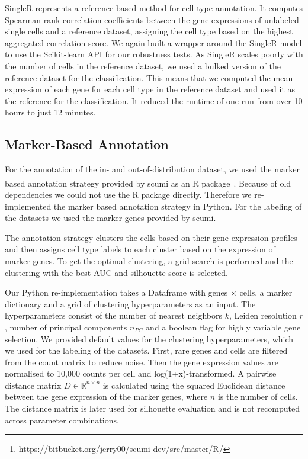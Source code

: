 \documentclass[11pt]{article}
\begin{document}
SingleR \cite{aran_reference-based_2019} represents a reference-based method for cell type annotation. It computes Spearman rank correlation coefficients between the gene expressions of unlabeled single cells and a reference dataset, assigning the cell type based on the highest aggregated correlation score.
We again built a wrapper around the SingleR model to use the Scikit-learn API for our robustness tests. 
As SingleR scales poorly with the number of cells in the reference dataset, we used a bulked version of the reference dataset for the classification. This means that we computed the mean expression of each gene for each cell type in the reference dataset and used it as the reference for the classification. It reduced the runtime of one run from over 10 hours to just 12 minutes.

\subsection{Marker-Based Annotation}\label{sec:methods:marker-based-annotation}

For the annotation of the in- and out-of-distribution dataset, we used the marker based annotation strategy provided by scumi \cite{ding_systematic_2020} as an R package\footnote{https://bitbucket.org/jerry00/scumi-dev/src/master/R/}. Because of old dependencies we could not use the R package directly. Therefore we re-implemented the marker based annotation strategy in Python. For the labeling of the datasets we used the marker genes provided by scumi.

The annotation strategy clusters the cells based on their gene expression profiles and then assigns cell type labels to each cluster based on the expression of marker genes. To get the optimal clustering, a grid search is performed and the clustering with the best AUC and silhouette score is selected.

Our Python re-implementation takes a Dataframe with genes $\times$ cells, a marker dictionary and a grid of clustering hyperparameters as an input. The hyperparameters consist of the number of nearest neighbors $k$, Leiden resolution $r$, number of principal components $n_{PC}$ and a boolean flag for highly variable gene selection. We provided default values for the clustering hyperparameters, which we used for the labeling of the datasets.
First, rare genes and cells are filtered from the count matrix to reduce noise. Then the gene expression values are normalised to 10,000 counts per cell and log(1+x)-transformed. A pairwise distance matrix $D \in \mathbb{R}^{n \times n}$ is calculated using the squared Euclidean distance between the gene expression of the marker genes, where $n$ is the number of cells. The distance matrix is later used for silhouette evaluation and is not recomputed across parameter combinations.
\end{document}
